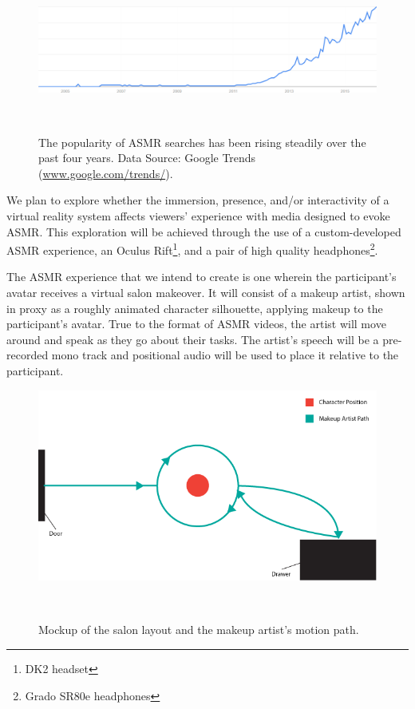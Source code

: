 \documentclass{sigchi}
\begin{document}
\begin{figure}[htb]
\centering
  \includegraphics[width=0.9\columnwidth]{figures/google-trends}
  \caption{The popularity of ASMR searches has been rising steadily over the past four years. Data Source: Google Trends (\url{www.google.com/trends/}).}~\label{fig:google-trends}
\end{figure}

We plan to explore whether the immersion, presence, and/or interactivity of a virtual reality system affects viewers' experience with media designed to evoke ASMR. This exploration will be achieved through the use of a custom-developed ASMR experience, an Oculus Rift\footnote{DK2 headset}, and a pair of high quality headphones\footnote{Grado SR80e headphones}.

The ASMR experience that we intend to create is one wherein the participant's avatar receives a virtual salon makeover. It will consist of a makeup artist, shown in proxy as a roughly animated character silhouette, applying makeup to the participant's avatar. True to the format of ASMR videos, the artist will move around and speak as they go about their tasks. The artist's speech will be a pre-recorded mono track and positional audio will be used to place it relative to the participant.

\begin{figure}[htb]
\centering
  \includegraphics[width=0.9\columnwidth]{figures/layout}
  \caption{Mockup of the salon layout and the makeup artist's motion path.}~\label{fig:layout}
\end{figure}
\end{document}
